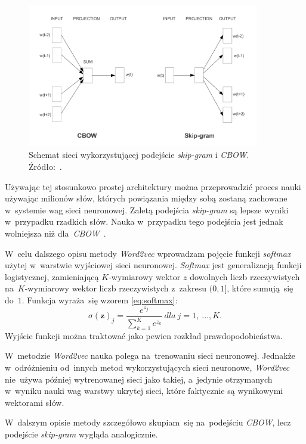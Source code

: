 \documentclass[pl]{minipw} %
\begin{document}
\begin{figure}[H]
	\centering
	\includegraphics[width=0.9\textwidth]{img/skipgram_cbow.png}
	\caption{Schemat sieci wykorzystującej podejście \textit{skip-gram} i \textit{CBOW}. Źródło:~\cite{word2vec}.}
\end{figure}
Używając tej stosunkowo prostej architektury można przeprowadzić proces nauki używając milionów słów, których powiązania między sobą zostaną zachowane w~systemie wag sieci neuronowej. Zaletą podejścia \textit{skip-gram} są lepsze wyniki w~przypadku rzadkich słów. Nauka w~przypadku tego podejścia jest jednak wolniejsza niż dla~\textit{CBOW}~\cite{google_word2vec}.

W~celu dalszego opisu metody \textit{Word2vec} wprowadzam pojęcie funkcji \textit{softmax} użytej w~warstwie wyjściowej sieci neuronowej. \textit{Softmax} jest generalizacją funkcji logistycznej, zamieniającą $K$-wymiarowy wektor $z$ dowolnych liczb rzeczywistych na~$K$-wymiarowy wektor liczb rzeczywistych z~zakresu $(0,1]$, które sumują~się do~$1$. Funkcja wyraża~się wzorem \ref{eq:softmax}:
\begin{equation}
\label{eq:softmax}
\sigma (\mathbf {z} )_{j}={\frac {e^{z_{j}}}{\sum _{k=1}^{K}e^{z_{k}}}}\ dla\ j=1,\ ...,K.
\end{equation}
Wyjście funkcji można traktować jako pewien rozkład prawdopodobieństwa.

W~metodzie \textit{Word2vec} nauka polega na~trenowaniu sieci neuronowej. Jednakże w~odróżnieniu od~innych metod wykorzystujących sieci neuronowe, \textit{Word2vec} nie~używa później wytrenowanej sieci jako takiej, a~jedynie otrzymanych w~wyniku nauki wag warstwy ukrytej sieci, które faktycznie są wynikowymi wektorami słów.

W~dalszym opisie metody szczegółowo skupiam~się na~podejściu \textit{CBOW}, lecz podejście \textit{skip-gram} wygląda analogicznie.
\end{document}
